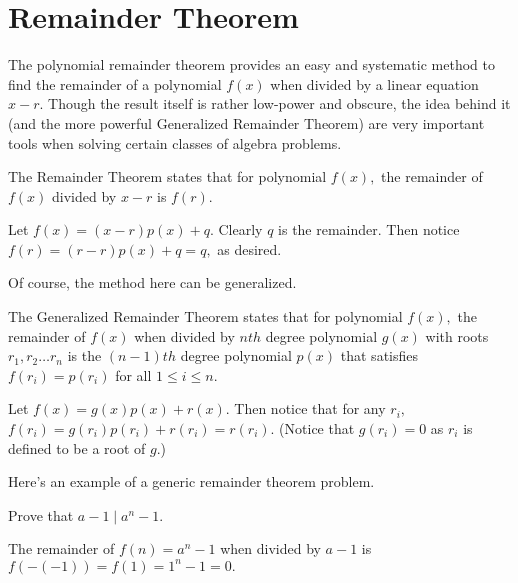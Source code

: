 \documentclass[mast]{lucky}
\begin{document}
\section{Remainder Theorem}
The polynomial remainder theorem provides an easy and systematic method to find the remainder of a polynomial $f(x)$ when divided by a linear equation $x-r.$ Though the result itself is rather low-power and obscure, the idea behind it (and the more powerful Generalized Remainder Theorem) are very important tools when solving certain classes of algebra problems.
\begin{theo}
The Remainder Theorem states that for polynomial $f(x),$ the remainder of $f(x)$ divided by $x-r$ is $f(r).$
\end{theo}

\begin{pro}
Let $f(x)=(x-r)p(x)+q.$ Clearly $q$ is the remainder. Then notice $f(r)=(r-r)p(x)+q=q,$ as desired.
\end{pro}

Of course, the method here can be generalized.
\begin{theo}
The Generalized Remainder Theorem states that for polynomial $f(x),$ the remainder of $f(x)$ when divided by $nth$ degree polynomial $g(x)$ with roots $r_1,r_2\dots r_n$ is the $(n-1)th$ degree polynomial $p(x)$ that satisfies $f(r_i)=p(r_i)$ for all $1\leq i\leq n.$
\end{theo}

\begin{pro}
Let $f(x)=g(x)p(x)+r(x).$ Then notice that for any $r_i,$ $f(r_i)=g(r_i)p(r_i)+r(r_i)=r(r_i).$ (Notice that $g(r_i)=0$ as $r_i$ is defined to be a root of $g.$)
\end{pro}

Here's an example of a generic remainder theorem problem.

\begin{exam}
Prove that $a-1\mid a^n-1.$
\end{exam}

\begin{sol}
The remainder of $f(n)=a^n-1$ when divided by $a-1$ is $f(-(-1))=f(1)=1^n-1=0.$
\end{sol}
\end{document}
